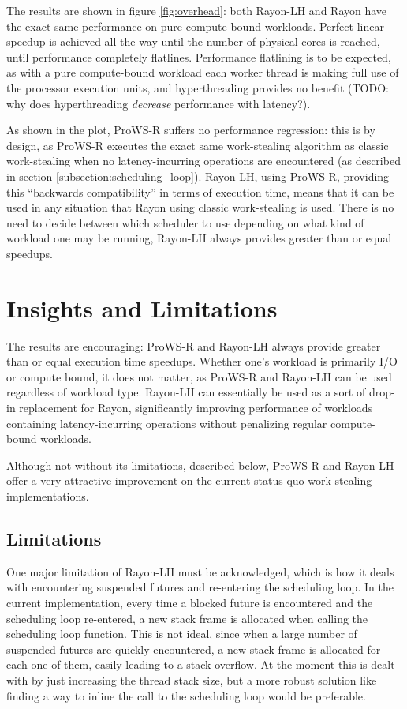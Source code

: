 \documentclass[bsc,frontabs,singlespacing,parskip,deptreport,normalheadings]{infthesis}
\begin{document}
The results are shown in figure \ref{fig:overhead}: both Rayon-LH and Rayon have
the exact same performance on pure compute-bound workloads. Perfect linear
speedup is achieved all the way until the number of physical cores is reached,
until performance completely flatlines. Performance flatlining is to be
expected, as with a pure compute-bound workload each worker thread is making
full use of the processor execution units, and hyperthreading provides no
benefit (TODO: why does hyperthreading \textit{decrease} performance with
latency?).

As shown in the plot, ProWS-R suffers no performance regression: this is by
design, as ProWS-R executes the exact same work-stealing algorithm as classic
work-stealing when no latency-incurring operations are encountered (as described
in section \ref{subsection:scheduling_loop}). Rayon-LH, using ProWS-R, providing
this ``backwards compatibility'' in terms of execution time, means that it can be
used in any situation that Rayon using classic work-stealing is used. There is
no need to decide between which scheduler to use depending on what kind of
workload one may be running, Rayon-LH always provides greater than or equal
speedups.

\section{Insights and Limitations}
\label{section:insights_and_limitations}

The results are encouraging: ProWS-R and Rayon-LH always provide greater than or
equal execution time speedups. Whether one's workload is primarily I/O or
compute bound, it does not matter, as ProWS-R and Rayon-LH can be used
regardless of workload type. Rayon-LH can essentially be used as a sort of
drop-in replacement for Rayon, significantly improving performance of workloads
containing latency-incurring operations without penalizing regular compute-bound
workloads.

Although not without its limitations, described below, ProWS-R and Rayon-LH
offer a very attractive improvement on the current status quo work-stealing
implementations.

\subsection{Limitations}

One major limitation of Rayon-LH must be acknowledged, which is how it deals
with encountering suspended futures and re-entering the scheduling loop. In the
current implementation, every time a blocked future is encountered and the
scheduling loop re-entered, a new stack frame is allocated when calling the
scheduling loop function. This is not ideal, since when a large number of
suspended futures are quickly encountered, a new stack frame is allocated for
each one of them, easily leading to a stack overflow. At the moment this is
dealt with by just increasing the thread stack size, but a more robust solution
like finding a way to inline the call to the scheduling loop would be
preferable.
\end{document}
